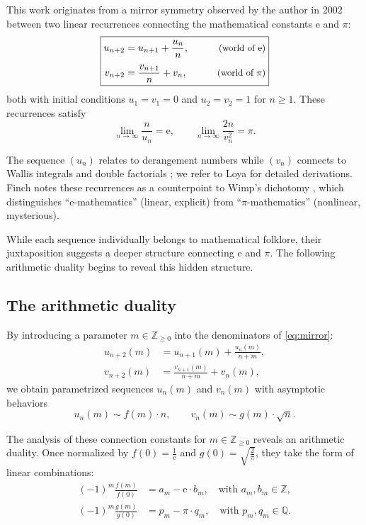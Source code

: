 \documentclass[11pt,reqno]{amsart}
\theoremstyle{definition}
\newcommand{\N}{\mathbb{Z}_{\ge 0}}
\newcommand{\Z}{\mathbb{Z}}
\newcommand{\Q}{\mathbb{Q}}
\newcommand{\ee}{\mathrm{e}}
\numberwithin{equation}{section}
\begin{document}
This work originates from a mirror symmetry observed by the author in 2002 between two linear recurrences connecting the mathematical constants $\ee$ and $\pi$:
\begin{equation}\label{eq:mirror}
\boxed{
\begin{aligned}
u_{n+2}&=u_{n+1}+\frac{u_{n}}{n}, \qquad &\text{\small (world of $\ee$)}\\[0.3em]
v_{n+2}&=\frac{v_{n+1}}{n}+v_{n}, \qquad &\text{\small (world of $\pi$)}
\end{aligned}
}
\end{equation}
both with initial conditions $u_{1}=v_{1}=0$ and $u_{2}=v_{2}=1$ for $n\ge 1$. These recurrences satisfy
$$\lim_{n\to\infty} \frac{n}{u_n} = \ee, \qquad \lim_{n\to\infty} \frac{2n}{v_n^2} = \pi.$$

The sequence $(u_n)$ relates to derangement numbers \cite{OEIS_A000166} while $(v_n)$ connects to Wallis integrals and double factorials \cite{OEIS_A006882}; we refer to Loya \cite[Section 7.7.3]{Loya2017} for detailed derivations. Finch \cite{Finch2003} notes these recurrences as a counterpoint to Wimp's dichotomy \cite{Wimp1984}, which distinguishes ``$\ee$-mathematics'' (linear, explicit) from ``$\pi$-mathematics'' (nonlinear, mysterious).

While each sequence individually belongs to mathematical folklore, their juxtaposition suggests a deeper structure connecting $\ee$ and $\pi$. The following arithmetic duality begins to reveal this hidden structure.

\subsection{The arithmetic duality}

By introducing a parameter $m\in\N$ into the denominators of \eqref{eq:mirror}:
\begin{equation}\label{eq:param}
\boxed{
\begin{aligned}
u_{n+2}(m) &= u_{n+1}(m)+\frac{u_{n}(m)}{n+m}, \\[0.3em]
v_{n+2}(m) &= \frac{v_{n+1}(m)}{n+m}+v_{n}(m),
\end{aligned}
}
\end{equation}
we obtain parametrized sequences $u_n(m)$ and $v_n(m)$ with asymptotic behaviors
\[
u_n(m) \sim f(m) \cdot n, \qquad v_n(m) \sim g(m) \cdot \sqrt{n}.
\]

The analysis of these connection constants for $m\in\N$ reveals an arithmetic duality. Once normalized by $f(0)=\frac{1}{\ee}$ and $g(0)=\sqrt{\frac{2}{\pi}}$, they take the form of linear combinations:
\begin{equation}\label{eq:duality}
\boxed{
\begin{aligned}
(-1)^m \frac{f(m)}{f(0)} &= a_m - \ee \cdot b_m, \quad \text{with } a_m, b_m \in \Z, \\[0.5em]
(-1)^m \frac{g(m)}{g(0)} &= p_m - \pi \cdot q_m, \quad \text{with } p_m, q_m \in \Q.
\end{aligned}
}
\end{equation}
\end{document}
